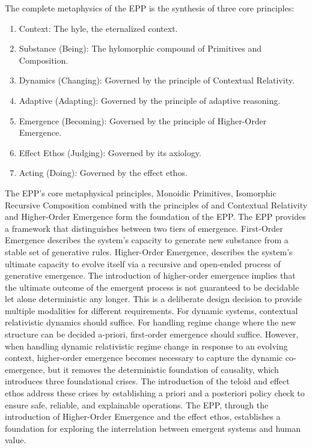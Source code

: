 The complete metaphysics of the EPP is the synthesis of three core principles:

\begin{enumerate}
	\item Context: The hyle, the eternalized context. 
	\item Substance (Being): The hylomorphic compound of Primitives and Composition.
	\item Dynamics (Changing): Governed by the principle of Contextual Relativity.
	\item Adaptive (Adapting): Governed by the principle of adaptive reasoning. 
	\item Emergence (Becoming): Governed by the principle of Higher-Order Emergence. 
	\item Effect Ethos (Judging): Governed by its axiology. 
	\item Acting (Doing): Governed by the effect ethos. 
\end{enumerate}


The EPP's core metaphysical principles, Monoidic Primitives, Isomorphic Recursive Composition combined with the principles of and Contextual Relativity and  Higher-Order Emergence form the foundation of the EPP. The EPP provides a framework that distinguishes between two tiers of emergence. First-Order Emergence describes the system's capacity to generate new  substance from a stable set of generative rules. Higher-Order Emergence, describes the system's ultimate capacity to evolve itself via a recursive and open-ended process of generative emergence. The introduction of higher-order emergence implies that the ultimate outcome of the emergent process is not guaranteed to be decidable let alone deterministic any longer. This is a deliberate design decision to provide multiple modalities for different requirements. For dynamic systems, contextual relativistic dynamics should suffice. For handling regime change where the new structure can be decided a-priori, first-order emergence should suffice. However, when handling dynamic relativistic regime change in response to an evolving context, higher-order emergence becomes necessary to capture the dynamic co-emergence, but it removes the deterministic foundation of causality, which introduces three foundational crises. The introduction of the teloid and effect ethos address these crises by establishing a priori and a posteriori policy check to ensure safe, reliable, and explainable operations. The EPP, through the introduction of Higher-Order Emergence and the effect ethos, establishes a foundation for exploring the interrelation between emergent systems and human value. 

\newpage
